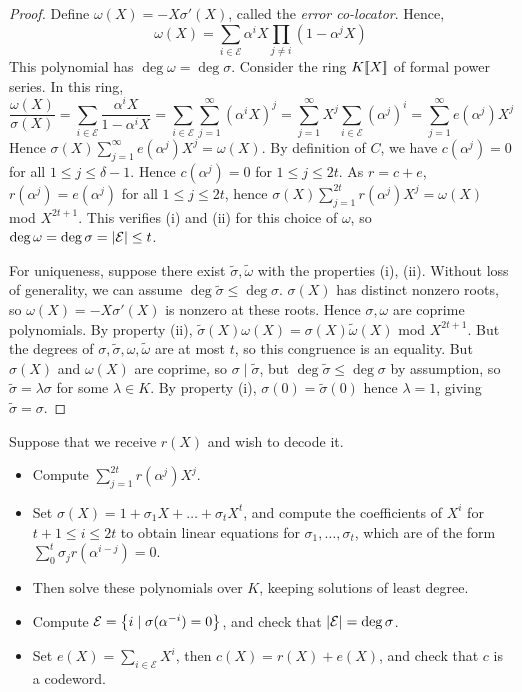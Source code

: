 \begin{proof}
    Define \( \omega(X) = -X\sigma'(X) \), called the \emph{error co-locator}.
    Hence,
    \[ \omega(X) = \sum_{i \in \mathcal E} \alpha^i X \prod_{j \neq i} (1 - \alpha^j X) \]
    This polynomial has \( \deg \omega = \deg \sigma \).
    Consider the ring \( K[\![X]\!] \) of formal power series.
    In this ring,
    \[ \frac{\omega(X)}{\sigma(X)} = \sum_{i \in \mathcal E} \frac{\alpha^i X}{1 - \alpha^i X} = \sum_{i \in \mathcal E} \sum_{j = 1}^\infty (\alpha^i X)^j = \sum_{j=1}^\infty X^j \sum_{i \in \mathcal E} (\alpha^j)^i = \sum_{j=1}^\infty e(\alpha^j) X^j \]
    Hence \( \sigma(X) \sum_{j=1}^\infty e(\alpha^j) X^j = \omega(X) \).
    By definition of \( C \), we have \( c(\alpha^j) = 0 \) for all \( 1 \leq j \leq \delta - 1 \).
    Hence \( c(\alpha^j) = 0 \) for \( 1 \leq j \leq 2t \).
    As \( r = c + e \), \( r(\alpha^j) = e(\alpha^j) \) for all \( 1 \leq j \leq 2t \), hence \( \sigma(X) \sum_{j=1}^{2t} r(\alpha^j) X^j = \omega(X) \) mod \( X^{2t+1} \).
    This verifies (i) and (ii) for this choice of \( \omega \), so \( \deg \omega = \deg \sigma = \abs{\mathcal E} \leq t \).

    For uniqueness, suppose there exist \( \widetilde \sigma, \widetilde \omega \) with the properties (i), (ii).
    Without loss of generality, we can assume \( \deg \widetilde \sigma \leq \deg \sigma \).
    \( \sigma(X) \) has distinct nonzero roots, so \( \omega(X) = -X\sigma'(X) \) is nonzero at these roots.
    Hence \( \sigma, \omega \) are coprime polynomials.
    By property (ii), \( \widetilde \sigma(X) \omega(X) = \sigma(X) \widetilde \omega(X) \) mod \( X^{2t+1} \).
    But the degrees of \( \sigma, \widetilde \sigma, \omega, \widetilde \omega \) are at most \( t \), so this congruence is an equality.
    But \( \sigma(X) \) and \( \omega(X) \) are coprime, so \( \sigma \mid \widetilde \sigma \), but \( \deg \widetilde \sigma \leq \deg \sigma \) by assumption, so \( \widetilde \sigma = \lambda \sigma \) for some \( \lambda \in K \).
    By property (i), \( \sigma(0) = \widetilde\sigma(0) \) hence \( \lambda = 1 \), giving \( \widetilde \sigma = \sigma \).
\end{proof}
Suppose that we receive \( r(X) \) and wish to decode it.
\begin{itemize}
    \item Compute \( \sum_{j=1}^{2t} r(\alpha^j) X^j \).
    \item Set \( \sigma(X) = 1 + \sigma_1 X + \dots + \sigma_t X^t \), and compute the coefficients of \( X^i \) for \( t + 1 \leq i \leq 2t \) to obtain linear equations for \( \sigma_1, \dots, \sigma_t \), which are of the form \( \sum_0^t \sigma_j r(\alpha^{i-j}) = 0 \).
    \item Then solve these polynomials over \( K \), keeping solutions of least degree.
    \item Compute \( \mathcal E = \qty{i \mid \sigma(\alpha^{-i}) = 0} \), and check that \( \abs{\mathcal E} = \deg \sigma \).
    \item Set \( e(X) = \sum_{i \in \mathcal E} X^i \), then \( c(X) = r(X) + e(X) \), and check that \( c \) is a codeword.
\end{itemize}

